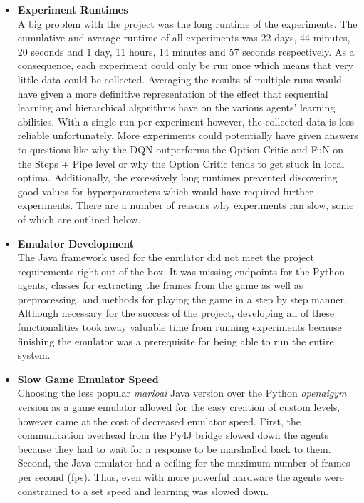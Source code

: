 \documentclass[notitlepage,a4paper,11pt]{article}
\begin{document}
\begin{itemize}
	\item
	\textbf{Experiment Runtimes}\\
	A big problem with the project was the long runtime of the experiments. The cumulative and average runtime of all experiments was 22 days, 44 minutes, 20 seconds and 1 day, 11 hours, 14 minutes and 57 seconds respectively. As a consequence, each experiment could only be run once which means that very little data could be collected. Averaging the results of multiple runs would have given a more definitive representation of the effect that sequential learning and hierarchical algorithms have on the various agents' learning abilities. With a single run per experiment however, the collected data is less reliable unfortunately. More experiments could potentially have given answers to questions like why the DQN outperforms the Option Critic and FuN on the Steps + Pipe level or why the Option Critic tends to get stuck in local optima. Additionally, the excessively long runtimes prevented discovering good values for hyperparameters which would have required further experiments. There are a number of reasons why experiments ran slow, some of which are outlined below.
	
	
	
	\item
	\textbf{Emulator Development}\\
	The Java framework used for the emulator did not meet the project requirements right out of the box. It was missing endpoints for the Python agents, classes for extracting the frames from the game as well as preprocessing, and methods for playing the game in a step by step manner. Although necessary for the success of the project, developing all of these functionalities took away valuable time from running experiments because finishing the emulator was a prerequisite for being able to run the entire system.
	
	\item
	\textbf{Slow Game Emulator Speed}\\
	Choosing the less popular \textit{marioai} Java version over the Python \textit{openaigym} version as a game emulator allowed for the easy creation of custom levels, however came at the cost of decreased emulator speed. First, the communication overhead from the Py4J bridge slowed down the agents because they had to wait for a response to be marshalled back to them. Second, the Java emulator had a ceiling for the maximum number of frames per second (fps). Thus, even with more powerful hardware the agents were constrained to a set speed and learning was slowed down.
	

\end{itemize}
\end{document}
